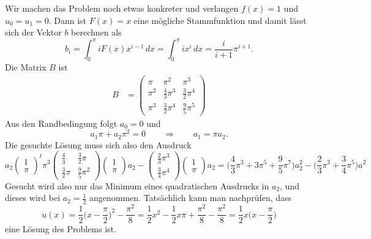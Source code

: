 Wir machen das Problem noch etwas konkreter und verlangen $f(x)=1$
und $u_0=u_1=0$.
Dann ist $F(x)=x$ eine mögliche Stammfunktion und damit lässt sich
der Vektor $b$ berechnen als
\[
b_i
=
\int_0^\pi i F(x) x^{i-1}\,dx
=
\int_0^\pi i x^i\,dx
=
\frac{i}{i+1}
\pi^{i+1}.
\]
Die Matrix $B$ ist
\begin{align*}
B&=\begin{pmatrix}
\pi   & \pi^2            & \pi^3            \\
\pi^2 & \frac{4}{3}\pi^3 & \frac{3}{2}\pi^4 \\
\pi^3 & \frac{3}{2}\pi^4 & \frac{9}{5}\pi^5
\end{pmatrix}
\end{align*}
Aus den Randbedingung folgt $a_0=0$ und
\[
a_1\pi+a_2\pi^2=0
\qquad\Rightarrow\qquad
a_1 = \pi a_2.
\]
Die gesuchte Lösung muss sich also den Ausdruck
\[
a_2
\begin{pmatrix}
1\\\pi
\end{pmatrix}^t
\pi^3
\begin{pmatrix}
\frac43   &\frac32\pi\\
\frac32\pi&\frac95\pi^2
\end{pmatrix}
\begin{pmatrix}
1\\\pi
\end{pmatrix}
a_2
-
\begin{pmatrix}
\frac23\pi^3\\\frac34\pi^4
\end{pmatrix}
\begin{pmatrix}
1\\\pi
\end{pmatrix}
a_2
=
\biggl(
\frac43\pi^3+3\pi^5 +\frac95\pi^7
\biggr)
a_2^2
-\biggl(\frac23\pi^3+\frac34\pi^5\biggr)
a^2
\]
Gesucht wird also nur das Minimum eines quadratischen Ausdrucks 
in $a_2$, und dieses wird bei $a_2=\frac12$ angenommen.
Tatsächlich kann man nachprüfen, dass
\[
u(x)
=
\frac12\biggl(x-\frac{\pi}2\biggr)^2 -\frac{\pi^2}8
=
\frac12x^2 -\frac12 x\pi +\frac{\pi^2}8 - \frac{\pi^2}8
=
\frac12x\biggl(x-\frac{\pi}2)
\]
eine Lösung des Problems ist.


